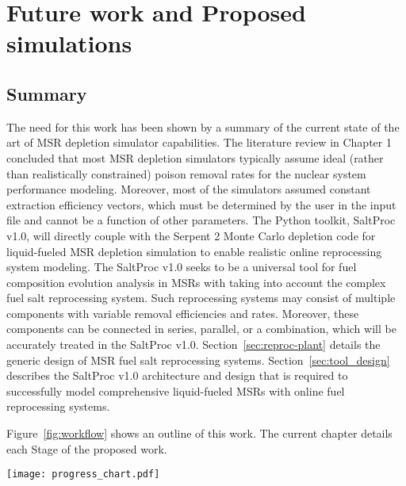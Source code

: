 \chapter[Future work and Proposed simulations]{Future work and Proposed 
simulations}

\section{Summary}
The need for this work has been shown by a summary of the current state of the 
art of \gls{MSR} depletion simulator capabilities. The literature review in 
Chapter 1 concluded that most \gls{MSR} depletion simulators typically assume 
ideal (rather than realistically constrained) poison removal rates for the 
nuclear system performance modeling. Moreover, most of the simulators assumed 
constant extraction efficiency vectors, which must be determined by the user 
in the input file and cannot be a function of other parameters. The Python 
toolkit, SaltProc v1.0, will directly couple with the Serpent 2 Monte Carlo 
depletion code for liquid-fueled \gls{MSR} depletion simulation to enable 
realistic online reprocessing system modeling. The SaltProc v1.0 seeks to be a 
universal tool for fuel composition evolution analysis in \glspl{MSR} with 
taking into account the complex fuel salt reprocessing system. Such 
reprocessing systems may consist of multiple components with variable removal 
efficiencies and rates. Moreover, these components can be connected in series, 
parallel, or a combination, which will be accurately treated in the SaltProc 
v1.0. Section~\ref{sec:reproc-plant} details the generic design of \gls{MSR}  
fuel salt reprocessing systems. Section~\ref{sec:tool_design} describes the  
SaltProc v1.0 architecture and design that is required to successfully model 
comprehensive liquid-fueled \glspl{MSR} with online fuel reprocessing systems. 

Figure~\ref{fig:workflow} shows an outline of this work. The current chapter 
details each Stage of the proposed work.
 \begin{sidewaysfigure}[ht!] %
 	\centering
 	\texttt{[image: progress\_chart.pdf]} 
 	\caption{Workflow for the simulations proposed in this work.}
 	\label{fig:workflow}
 \end{sidewaysfigure}
 \FloatBarrier
 
 

